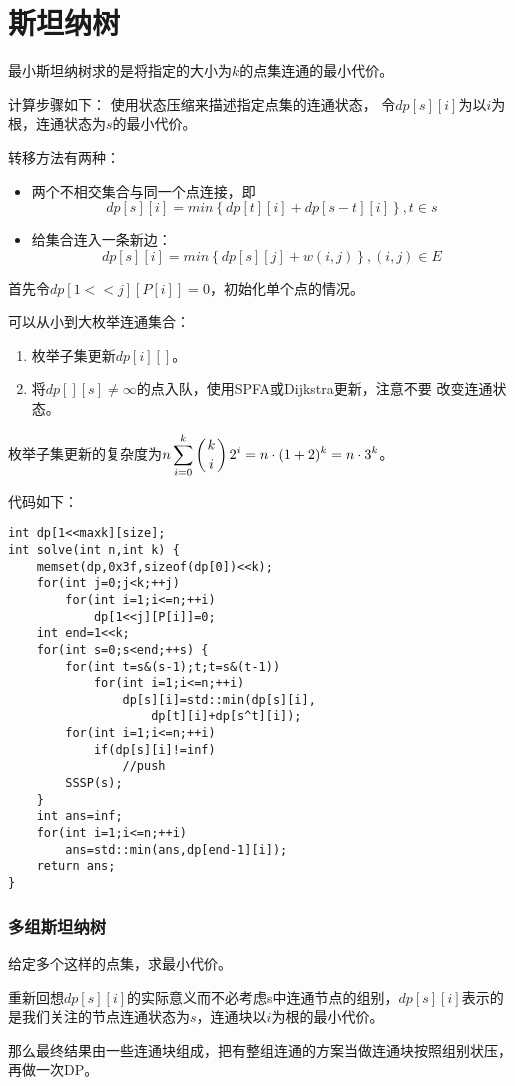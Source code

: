 \section{斯坦纳树}
最小斯坦纳树求的是将指定的大小为$k$的点集连通的最小代价。

计算步骤如下：
使用状态压缩来描述指定点集的连通状态，
令$dp[s][i]$为以$i$为根，连通状态为$s$的最小代价。

转移方法有两种：
\begin{itemize}
    \item 两个不相交集合与同一个点连接，即
    \begin{displaymath}
        dp[s][i]=min\left\{dp[t][i]+dp[s-t][i]\right\},t\in s
    \end{displaymath}
    \item 给集合连入一条新边：
    \begin{displaymath}
        dp[s][i]=min\left\{dp[s][j]+w(i,j)\right\},(i,j)\in E
    \end{displaymath}
\end{itemize}

首先令$dp[1<<j][P[i]]=0$，初始化单个点的情况。

可以从小到大枚举连通集合：
\begin{enumerate}
    \item 枚举子集更新$dp[i][]$。
    \item 将$dp[][s]\neq \infty$的点入队，使用SPFA或Dijkstra更新，注意不要
    改变连通状态。
\end{enumerate}

枚举子集更新的复杂度为$\displaystyle n\sum_{i=0}^k{\left(k \atop i\right)2^i}=
n\cdot(1+2)^k=n\cdot 3^k$。

代码如下：
\begin{lstlisting}
int dp[1<<maxk][size];
int solve(int n,int k) {
    memset(dp,0x3f,sizeof(dp[0])<<k);
    for(int j=0;j<k;++j)
        for(int i=1;i<=n;++i)
            dp[1<<j][P[i]]=0;
    int end=1<<k;
    for(int s=0;s<end;++s) {
        for(int t=s&(s-1);t;t=s&(t-1))
            for(int i=1;i<=n;++i)
                dp[s][i]=std::min(dp[s][i],
                    dp[t][i]+dp[s^t][i]);
        for(int i=1;i<=n;++i)
            if(dp[s][i]!=inf)
                //push
        SSSP(s);
    }
    int ans=inf;
    for(int i=1;i<=n;++i)
        ans=std::min(ans,dp[end-1][i]);
    return ans;
}
\end{lstlisting}

\subsubsection{多组斯坦纳树}
给定多个这样的点集，求最小代价。

重新回想$dp[s][i]$的实际意义而不必考虑s中连通节点的组别，$dp[s][i]$表示的
是我们关注的节点连通状态为$s$，连通块以$i$为根的最小代价。

那么最终结果由一些连通块组成，把有整组连通的方案当做连通块按照组别状压，再做一次DP。
